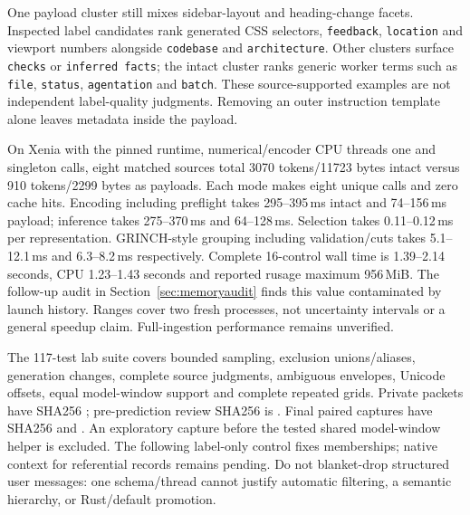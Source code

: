 \documentclass[11pt]{article}
\begin{document}
One payload cluster still mixes sidebar-layout and heading-change facets.
Inspected label candidates rank generated CSS selectors, \texttt{feedback},
\texttt{location} and viewport numbers alongside \texttt{codebase} and
\texttt{architecture}. Other clusters surface \texttt{checks} or
\texttt{inferred facts}; the intact cluster ranks generic worker terms such as
\texttt{file}, \texttt{status}, \texttt{agentation} and \texttt{batch}.
These source-supported examples are not independent label-quality judgments.
Removing an outer instruction template alone leaves metadata inside the payload.

On Xenia with the pinned runtime, numerical/encoder CPU threads one and singleton
calls, eight matched sources total 3070 tokens/11723 bytes intact versus
910 tokens/2299 bytes as payloads. Each mode makes eight unique calls and zero
cache hits. Encoding including preflight takes 295--395\,ms intact and
74--156\,ms payload; inference takes 275--370\,ms and 64--128\,ms.
Selection takes 0.11--0.12\,ms per representation. GRINCH-style grouping
including validation/cuts takes 5.1--12.1\,ms and 6.3--8.2\,ms respectively.
Complete 16-control wall time is 1.39--2.14 seconds, CPU 1.23--1.43 seconds and
reported rusage maximum 956\,MiB. The follow-up audit in
Section~\ref{sec:memoryaudit} finds this value contaminated by launch history.
Ranges cover two fresh processes, not uncertainty intervals or a
general speedup claim. Full-ingestion performance remains unverified.

The 117-test lab suite covers bounded sampling, exclusion unions/aliases,
generation changes, complete source judgments, ambiguous envelopes, Unicode
offsets, equal model-window support and complete repeated grids. Private
 packets have SHA256
;
pre-prediction review SHA256 is
.
Final paired captures have SHA256
and .
An exploratory capture before the tested shared model-window helper is excluded.
The following label-only control fixes memberships; native context for referential
records remains pending. Do not blanket-drop structured
user messages: one schema/thread cannot justify automatic filtering, a semantic
hierarchy, or Rust/default promotion.
\end{document}

